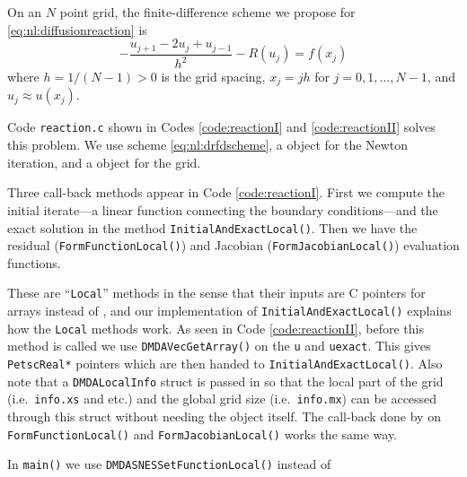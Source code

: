 On an $N$ point grid, the finite-difference scheme we propose for \eqref{eq:nl:diffusionreaction} is
\begin{equation}
- \frac{u_{j+1} - 2 u_j + u_{j-1}}{h^2} - R(u_j) = f(x_j)   \label{eq:nl:drfdscheme}
\end{equation}
where $h=1/(N-1)>0$ is the grid spacing, $x_j = j h$ for $j=0,1,\dots,N-1$, and $u_j \approx u(x_j)$.

Code \texttt{reaction.c} shown in Codes \ref{code:reactionI} and \ref{code:reactionII} solves this problem.  We use scheme \eqref{eq:nl:drfdscheme}, a \pSNES object for the Newton iteration, and a \pDMDA object for the grid.


Three call-back methods appear in Code \ref{code:reactionI}.  First we compute the initial iterate---a linear function connecting the boundary conditions---and the exact solution in the method \texttt{InitialAndExactLocal()}.  Then we have the residual (\texttt{FormFunctionLocal()}) and Jacobian (\texttt{FormJacobianLocal()}) evaluation functions.


These are ``\texttt{Local}'' methods in the sense that their inputs are C pointers for arrays instead of \pVecs, and our implementation of \texttt{InitialAndExactLocal()} explains how the \texttt{Local} methods work.  As seen in Code \ref{code:reactionII}, before this method is called we use \texttt{DMDAVecGetArray()} on the \pVecs \texttt{u} and \texttt{uexact}.  This gives \texttt{PetscReal*} pointers which are then handed to \texttt{InitialAndExactLocal()}.  Also note that a \texttt{DMDALocalInfo} struct is passed in so that the local part of the grid (i.e.~\texttt{info.xs} and etc.) and the global grid size (i.e.~\texttt{info.mx}) can be accessed through this struct without needing the \pDMDA object itself.  The call-back done by \pSNES on \texttt{FormFunctionLocal()} and \texttt{FormJacobianLocal()} works the same way.

In \texttt{main()} we use \texttt{DMDASNESSetFunctionLocal()} instead of

